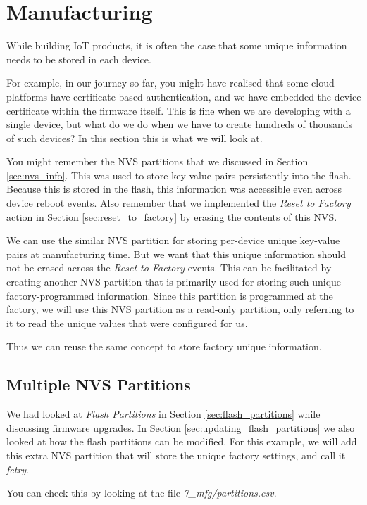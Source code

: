 \documentclass[main.tex]{subfiles}
\begin{document}
\chapter{Manufacturing}

While building IoT products, it is often the case that some unique information needs to be stored in each device. 

For example, in our journey so far, you might have realised that some cloud platforms have certificate based authentication, and we have embedded the device certificate within the firmware itself. This is fine when we are developing with a single device, but what do we do when we have to create hundreds of thousands of such devices? In this section this is what we will look at.

You might remember the NVS partitions that we discussed in Section \ref{sec:nvs_info}. This was used to store key-value pairs persistently into the flash. Because this is stored in the flash, this information was accessible even across device reboot events. Also remember that we implemented the \textit{Reset to Factory} action in Section \ref{sec:reset_to_factory} by erasing the contents of this NVS.

We can use the similar NVS partition for storing per-device unique key-value pairs at manufacturing time. But we want that this unique information should not be erased across the \textit{Reset to Factory} events. This can be facilitated by creating another NVS partition that is primarily used for storing such unique factory-programmed information. Since this partition is programmed at the factory, we will use this NVS partition as a read-only partition, only referring to it to read the unique values that were configured for us.

Thus we can reuse the same concept to store factory unique information.

\section{Multiple NVS Partitions}
We had looked at \textit{Flash Partitions} in Section \ref{sec:flash_partitions} while discussing firmware upgrades. In Section \ref{sec:updating_flash_partitions} we also looked at how the flash partitions can be modified. For this example, we will add this extra NVS partition that will store the unique factory settings, and call it \textit{fctry}.

You can check this by looking at the file \textit{7\_mfg/partitions.csv}.
\end{document}
